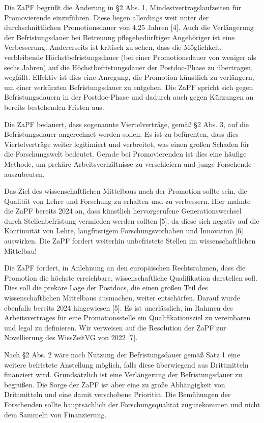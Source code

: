 \documentclass[DIV=calc]{scrartcl}
\begin{document}
Die ZaPF begrüßt die Änderung in §2 Abs. 1, Mindestvertragslaufzeiten für Promovierende einzuführen. Diese liegen allerdings weit unter der durchschnittlichen Promotionsdauer von 4,25 Jahren [4]. Auch die Verlängerung der Befristungsdauer bei Betreuung pflegebedürftiger Angehöriger ist eine Verbesserung.
Andererseits ist kritisch zu sehen, dass die Möglichkeit, verbleibende Höchstbefristungsdauer (bei einer Promotionsdauer von weniger als sechs Jahren) auf die Höchstbefristungsdauer der Postdoc-Phase zu übertragen, wegfällt. Effektiv ist dies eine Anregung, die Promotion künstlich zu verlängern, um einer verkürzten Befristungsdauer zu entgehen. Die ZaPF spricht sich gegen Befristungsdauern in der Postdoc-Phase und dadurch auch gegen Kürzungen an bereits bestehenden Fristen aus.

Die ZaPF bedauert, dass sogenannte Viertelverträge, gemäß §2 Abs. 3, auf die Befristungsdauer angerechnet werden sollen. Es ist zu befürchten, dass dies Viertelverträge weiter legitimiert und verbreitet, was einen großen Schaden für die Forschungswelt bedeutet. Gerade bei Promovierenden ist dies eine häufige Methode, um prekäre Arbeitsverhältnisse zu verschleiern und junge Forschende auszubeuten.

Das Ziel des wissenschaftlichen Mittelbaus nach der Promotion sollte sein, die Qualität von Lehre und Forschung zu erhalten und zu verbessern. Hier mahnte die ZaPF bereits 2024 an, dass künstlich hervorgerufene Generationswechsel durch Stellenbefristung vermieden werden sollten [5], da diese sich negativ auf die Kontinuität von Lehre, langfristigem Forschungsvorhaben und Innovation [6] auswirken. Die ZaPF fordert weiterhin unbefristete Stellen im wissenschaftlichen Mittelbau! 

Die ZaPF fordert, in Anlehnung an den europäischen Rechtsrahmen, dass die Promotion die höchste erreichbare, wissenschaftliche Qualifikation darstellen soll. Dies soll die prekäre Lage der Postdocs, die einen großen Teil des wissenschaftlichen Mittelbaus ausmachen, weiter entschärfen. Darauf wurde ebenfalls bereits 2024 hingewiesen [5]. Es ist unerlässlich, im Rahmen des Arbeitsvertrages für eine Promotionsstelle ein Qualifikationsziel zu vereinbaren und legal zu definieren. Wir verweisen auf die Resolution der ZaPF zur Novellierung des WissZeitVG von 2022 [7]. 

Nach §2 Abs. 2 wäre nach Nutzung der Befristungsdauer gemäß Satz 1 eine weitere befristete Anstellung möglich, falls diese überwiegend aus Drittmitteln finanziert wird. Grundsätzlich ist eine Verlängerung der Befristungsdauer zu begrüßen. Die Sorge der ZaPF ist aber eine zu große Abhängigkeit von Drittmitteln und eine damit verschobene Priorität. Die Bemühungen der Forschenden sollte hauptsächlich der Forschungsqualität zugutekommen und nicht dem Sammeln von Finanzierung.
\end{document}
